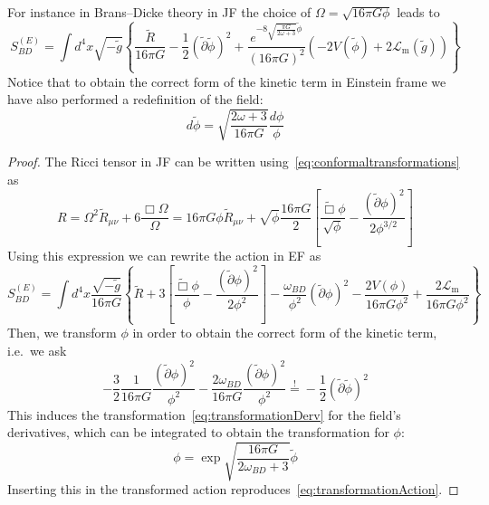 For instance in Brans–Dicke theory in JF 
the choice of $\Omega = \sqrt{16 \pi G \phi}$ leads to
\begin{equation}\label{eq:transformationAction}
S_{BD}^{(E)} = \int d^4x \sqrt{-\tilde{g}} \left\{\frac{\tilde{R}}{16\pi G} - \frac{1}{2} (\tilde{\partial} \tilde{\phi})^2 
+ \frac{e^{ -8 \sqrt{\frac{\pi G}{2\omega + 3}} \tilde{\phi} }}{(16\pi G)^2} \left(-2 V(\tilde{\phi})+ 2\mathcal{L}_{\text{m}}(\tilde{g})\right) \right\}
\end{equation}
Notice that to obtain the correct form of the kinetic term in Einstein frame we have also performed a redefinition of the field:
\begin{equation}\label{eq:transformationDerv}
    d\tilde{\phi} = \sqrt{\frac{2\omega + 3}{16\pi G}} \frac{d\phi}{\phi}
\end{equation}
\begin{proof}
  The Ricci tensor in JF can be written using~\eqref{eq:conformaltransformations} as
  \begin{equation*}
    R = \Omega^2 \tilde{R}_{\mu\nu} +6 \frac{\Box \Omega}{\Omega} = 16\pi G \phi \tilde{R}_{\mu\nu} + \sqrt{\phi} \frac{16\pi G}{2} \left[\frac{\tilde{\Box} \phi}{\sqrt{\phi}} - \frac{(\tilde{\partial} \phi)^2}{2 \phi^{3/2}}\right]
  \end{equation*}
  Using this expression we can rewrite the action in EF as
  \begin{equation*}
    S_{BD}^{(E)} = \int d^4x \frac{\sqrt{-\tilde{g}}}{16 \pi G}\left\{ \tilde{R}+ 3\left[\frac{\tilde{\Box} \phi}{\phi} - \frac{(\tilde{\partial} \phi)^2}{2 \phi^2}\right]  - \frac{\omega_{BD}}{\phi^2} (\tilde{\partial} \phi)^2  -  \frac{2V(\phi)}{16 \pi G \phi^2} + \frac{2\mathcal{L}_{\text{m}}}{16 \pi G \phi^2}  \right\}
  \end{equation*}
  Then, we transform $\phi$ in order to obtain the correct form of the kinetic term, i.e.\ we ask 
  \begin{equation*}
    -\frac{3}{2}\frac{1}{16 \pi G}\frac{(\tilde{\partial} \phi)^2}{\phi^2} - \frac{2 \omega_{BD}}{16 \pi G} \frac{(\tilde{\partial} \phi)^2}{\phi^2} \overset{!}{=} - \frac{1}{2} (\tilde{\partial} \tilde{\phi})^2
  \end{equation*}
  This induces the transformation~\eqref{eq:transformationDerv} for the field's derivatives, which can be integrated to obtain the transformation for $\phi$:
  \begin{equation*}
    \phi= \exp{\sqrt{\frac{16 \pi G}{2\omega_{BD}+3}}\tilde{\phi}}
  \end{equation*}
  Inserting this in the transformed action reproduces~\eqref{eq:transformationAction}.


\end{proof}
